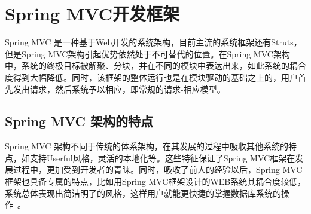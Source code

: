 

\section{Spring MVC开发框架}
Spring MVC 是一种基于Web开发的系统架构，目前主流的系统框架还有Struts，但是Spring MVC架构引起优势依然处于不可替代的位置。在Spring MVC架构中，系统的终极目标被解聚、分块，并在不同的模块中表达出来，如此系统的耦合度得到大幅降低。同时，该框架的整体运行也是在模块驱动的基础之上的，用户首先发出请求，然后系统予以相应，即常规的请求-相应模型。
\subsection{Spring MVC 架构的特点}
Spring MVC 架构不同于传统的体系架构，在其发展的过程中吸收其他系统的特点，如支持Userful风格，灵活的本地化等。这些特征保证了Spring MVC框架在发展过程中，更加受到开发者的青睐。同时，吸收了前人的经验以后，Spring MVC框架也具备专属的特点，比如用Spring MVC框架设计的WEB系统其耦合度较低，系统总体表现出简洁明了的风格，这样用户就能更快捷的掌握数据库系统的操作~\cite{林薇2015基于}。

